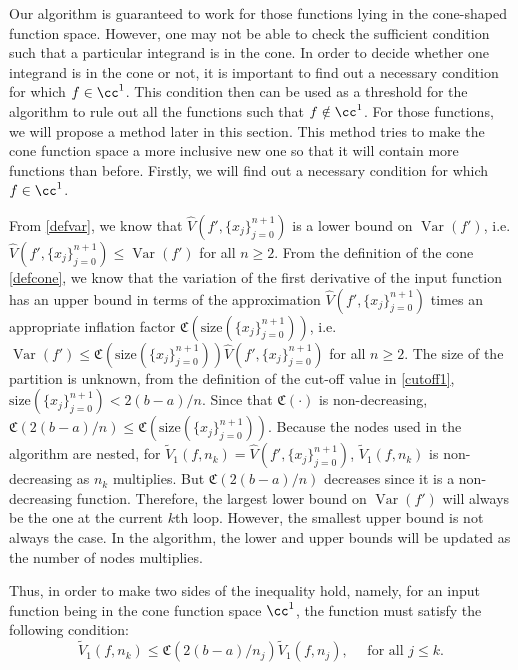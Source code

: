 \documentclass{iitthesis}
\DeclareMathOperator{\Var}{Var}
\theoremstyle{definition}
\theoremstyle{remark}
\begin{document}

Our algorithm is guaranteed to work for those functions lying in the cone-shaped function space. However, one may not be able to check the sufficient condition such that a particular integrand is in the cone. In order to decide whether one integrand is in the cone or not, it is important to find out a necessary condition for which $f\in\cc^1$. This condition then can be used as a threshold for the algorithm to rule out all the functions such that $f\notin\cc^1$. For those functions, we will propose a method later in this section. This method tries to make the cone function space a more inclusive new one so that it will contain more functions than before. Firstly, we will find out a necessary condition for which $f\in\cc^1$.

From \eqref{defvar}, we know that $\widehat{V}({f'},\{x_j\}_{j=0}^{n+1})$ is a lower bound on $\Var({f'})$, i.e. $\widehat{V}({f'},\{x_j\}_{j=0}^{n+1})\leq \Var({f'})$ for all $n \ge 2$. From the definition of the cone \eqref{defcone}, we know that the variation of the first derivative of the input function has an upper bound in terms of the approximation $\widehat{V}({f'},\{x_j\}_{j=0}^{n+1})$ times an appropriate inflation factor $\mathfrak{C}(\text{size}(\{x_j\}_{j=0}^{n+1}))$, i.e. $\Var({f'})\leq \mathfrak{C}(\text{size}(\{x_j\}_{j=0}^{n+1}))\widehat{V}({f'},\{x_j\}_{j=0}^{n+1})$ for all $n \ge 2$. The size of the partition is unknown, from the definition of the cut-off value in \eqref{cutoff1}, $\text{size}(\{x_j\}_{j=0}^{n+1})<2(b-a)/n$. Since  that $\mathfrak{C}(\cdot)$ is non-decreasing, $\mathfrak{C}(2(b-a)/n)\leq \mathfrak{C}(\text{size}(\{x_j\}_{j=0}^{n+1}))$. Because the nodes used in the algorithm are nested, for $\widetilde{V}_1(f,n_k)=\widehat{V}({f'},\{x_j\}_{j=0}^{n+1})$, $\widetilde{V}_1(f,n_k)$ is non-decreasing as $n_k$ multiplies. But $\mathfrak{C}(2(b-a)/n)$ decreases since it is a non-decreasing function. Therefore, the largest lower bound on $\Var(f')$ will always be the one at the current $k$th loop. However, the smallest upper bound is not always the case. In the algorithm, the lower and upper bounds will be updated as the number of nodes multiplies.

Thus, in order to make two sides of the inequality hold, namely, for an input function being in the cone function space $\cc^1$, the function must satisfy the following condition:
\begin{equation}\label{neccontrap}
    \widetilde{V}_1(f,n_k)\leq\mathfrak{C}(2(b-a)/n_{j})\widetilde{V}_1(f,n_j), \quad \text{ for all } j \leq k.
\end{equation}
\end{document}
